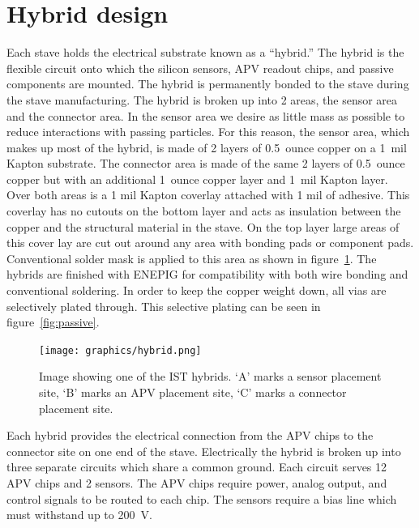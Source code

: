 \documentclass[preprint,12pt]{elsarticle}
\begin{document}
\section{Hybrid design}
Each stave holds the electrical substrate known as a ``hybrid.''  The hybrid is
the flexible circuit onto which the silicon sensors, APV readout chips, and passive
components are mounted. The hybrid is permanently bonded to the stave during
the stave manufacturing. The hybrid is broken up into 2 areas, the sensor area
and the connector area. In the sensor
area we desire as little mass as possible to reduce interactions with passing
particles. For this reason, the sensor area, which makes up most of the hybrid,
is made of 2 layers of 0.5~ounce copper on a 1~mil Kapton substrate. The connector
area is made of the same 2 layers of 0.5~ounce copper but with an additional
1~ounce copper layer and 1~mil Kapton layer. Over both areas is a 1 mil Kapton
coverlay attached with 1 mil of adhesive. This coverlay has no cutouts on the
bottom layer and acts as insulation between the copper and the structural
material in the stave. On the top layer large areas of this cover lay are cut out around
any area with bonding pads or component pads. Conventional solder mask is
applied to this area as shown in figure~\ref{fig:hybrid}. The hybrids are finished with ENEPIG for compatibility
with both wire bonding and conventional soldering. In order to keep the copper
weight down, all vias are selectively plated through.  This selective plating
can be seen in figure~\ref{fig:passive}.

\begin{figure}[h]
\begin{center}
\texttt{[image: graphics/hybrid.png]}
\caption{Image showing one of the IST hybrids. `A' marks a sensor placement site,
`B' marks an APV placement site, `C' marks a connector placement site.
\label{fig:hybrid}}
\end{center}
\end{figure}
%
Each hybrid provides the electrical connection from the APV chips to the
connector site on one end of the stave. Electrically the hybrid is broken up
into three separate circuits which share a common ground. Each circuit
serves 12 APV chips and 2 sensors. The APV chips require power, analog output,
and control signals to be routed to each chip. The sensors require a bias line
which must withstand up to 200~V.
\end{document}
